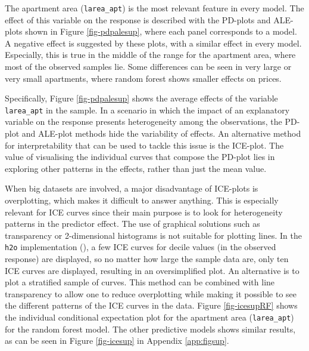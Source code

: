 \documentclass[smallextended,natbib]{svjour3}\usepackage[]{graphicx}\usepackage[]{xcolor}
\begin{document}
The apartment area (\texttt{larea\_apt}) is the most relevant feature in every model. The effect of this variable on the response is described with the PD-plots and ALE-plots shown in Figure \ref{fig-pdpalesup}, where each panel corresponds to a model. A negative effect is suggested by these plots, with a similar effect in every model. Especially, this is  true  in the middle of the range for the apartment area, where most of the observed samples lie. Some differences can be seen in very large or very small apartments, where random forest shows smaller effects on prices. 

Specifically, Figure \ref{fig-pdpalesup} shows the average effects of the variable \texttt{larea\_apt}  in the sample. In a scenario in which the impact of an explanatory variable on the response presents heterogeneity among the observations, the PD-plot and ALE-plot methods hide the variability of effects. An alternative method for interpretability that can be used to tackle this issue is the ICE-plot. The value of visualising the individual curves that compose the PD-plot lies in exploring other patterns in the effects, rather than just the mean value.  

When big datasets are involved, a major disadvantage of ICE-plots is overplotting, which makes it difficult to answer  anything. This is especially relevant for ICE curves since their main purpose is to look for heterogeneity patterns in the predictor effect. The use of graphical solutions such as transparency or 2-dimensional histograms is not suitable for plotting lines.  In the \texttt{h2o} implementation (\cite{hall2017}), a few ICE curves for decile values (in the observed response) are displayed, so no matter how large the sample data are, only ten ICE curves are displayed, resulting in an oversimplified plot. An alternative is to plot a stratified sample of curves. This method can be combined with line transparency to allow one to reduce overplotting while making it possible to see the different patterns of the ICE curves in the data. Figure \ref{fig-icesupRF} shows the individual conditional expectation plot for the apartment area (\texttt{larea\_apt}) for the  random forest model. The other predictive models shows similar results, as can be seen in Figure \ref{fig-icesup} in Appendix \ref{app:figsup}. 
\end{document}

